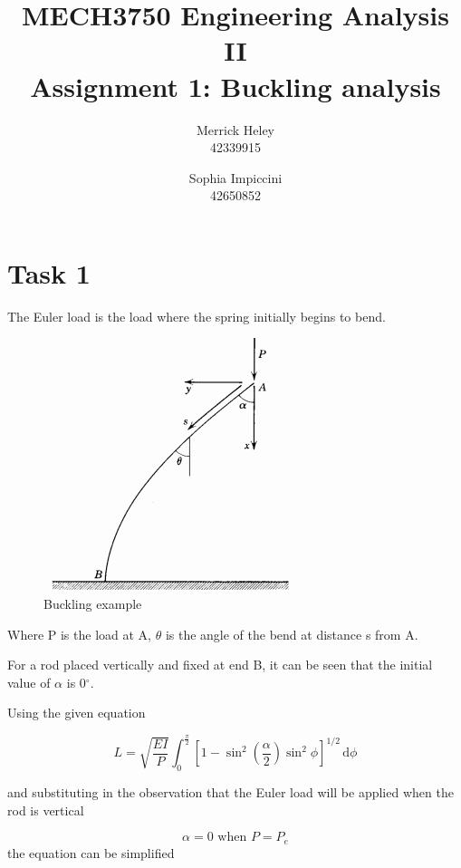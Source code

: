 \documentclass[a4paper,11pt,titlepage]{article}
\title{
MECH3750 Engineering Analysis II \\ 
Assignment 1: Buckling analysis
}
\author{
Merrick Heley\\
42339915
\and
Sophia Impiccini\\
42650852
}
\newcommand{\ud}{\,\mathrm{d}}
\begin{document}
\maketitle

\section*{Task 1}

The Euler load is the load where the spring initially begins to bend.

\begin{figure}[!hbp]
\centering
\includegraphics{buckling.png}
\caption{Buckling example}
\end{figure}

Where P is the load at A, $\theta$ is the angle of the bend at distance s 
from A.

For a rod placed vertically and fixed at end B, it can be seen that the initial
value of $\alpha$ is 0$^\circ$.

Using the given equation

\begin{equation}
L = 
\sqrt{\frac{EI}{P}} 
\int_0^{\frac{\pi}{2}} 
    {\displaystyle{\left[
        1-\sin^2{\left(\frac{\alpha}{2}\right)}\sin^2{\phi}
    \right]^{1/2}}}
\ud \phi \label{eq:L}
\end{equation}

and substituting in the observation that the Euler load will be applied when the
rod is vertical

\begin{equation}
\alpha = 0 \text{ when } P = P_e
\end{equation}
the equation can be simplified 
\end{document}
